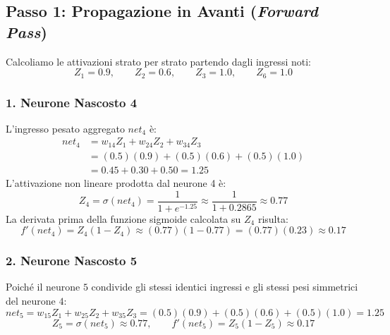 \FloatBarrier
\subsection{Passo 1: Propagazione in Avanti (\textit{Forward Pass})}
\label{subsec:dm-step1-forward-pass}

Calcoliamo le attivazioni strato per strato partendo dagli ingressi noti:
\begin{equation}
    Z_1 = 0.9, \qquad Z_2 = 0.6, \qquad Z_3 = 1.0, \qquad Z_6 = 1.0
\end{equation}

\subsubsection{1. Neurone Nascosto 4}
L'ingresso pesato aggregato $net_4$ è:
\begin{align}
    net_4 &= w_{14} Z_1 + w_{24} Z_2 + w_{34} Z_3 \nonumber \\
          &= (0.5)(0.9) + (0.5)(0.6) + (0.5)(1.0) \nonumber \\
          &= 0.45 + 0.30 + 0.50 = 1.25
\end{align}
L'attivazione non lineare prodotta dal neurone 4 è:
\begin{equation}
    Z_4 = \sigma(net_4) = \frac{1}{1 + e^{-1.25}} \approx \frac{1}{1 + 0.2865} \approx \mathbf{0.77}
\end{equation}
La derivata prima della funzione sigmoide calcolata su $Z_4$ risulta:
\begin{equation}
    f'(net_4) = Z_4 (1 - Z_4) \approx (0.77)(1 - 0.77) = (0.77)(0.23) \approx \mathbf{0.17}
\end{equation}

\subsubsection{2. Neurone Nascosto 5}
Poiché il neurone $5$ condivide gli stessi identici ingressi e gli stessi pesi simmetrici del neurone $4$:
\begin{equation}
    net_5 = w_{15} Z_1 + w_{25} Z_2 + w_{35} Z_3 = (0.5)(0.9) + (0.5)(0.6) + (0.5)(1.0) = 1.25
\end{equation}
\begin{equation}
    Z_5 = \sigma(net_5) \approx \mathbf{0.77}, \qquad f'(net_5) = Z_5 (1 - Z_5) \approx \mathbf{0.17}
\end{equation}

